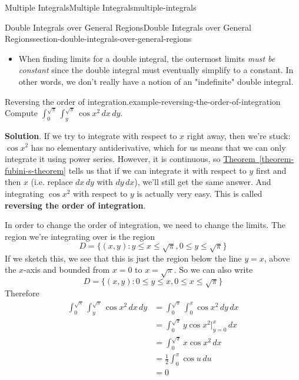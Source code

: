 \documentclass[oneside,10pt,]{book}
\newcommand{\terminology}[1]{\textbf{#1}}
\numberwithin{equation}{section}
\begin{document}
\begin{chapterptx}{Multiple Integrals}{}{Multiple Integrals}{}{}{multiple-integrals}
\begin{sectionptx}{Double Integrals over General Regions}{}{Double Integrals over General Regions}{}{}{section-double-integrals-over-general-regions}
\begin{itemize}[label=\textbullet]
\item{}When finding limits for a double integral, the outermost limits \emph{must be constant} since the double integral must eventually simplify to a constant. In other words, we don't really have a notion of an "indefinite" double integral.%
\end{itemize}
%
\begin{example}{Reversing the order of integration.}{example-reversing-the-order-of-integration}%
\hypertarget{p-1480}{}%
Compute \(\int_{0}^{\sqrt{\pi}}\int_{y}^{\sqrt{\pi}}\cos x^{2}\,dx\,dy\).%
\par\smallskip%
\noindent\textbf{Solution}.\hypertarget{solution-242}{}\quad%
\hypertarget{p-1481}{}%
If we try to integrate with respect to \(x\) right away, then we're stuck: \(\cos x^{2}\) has no elementary antiderivative, which for us means that we can only integrate it using power series. However, it is continuous, so \hyperref[theorem-fubini-s-theorem]{Theorem~\ref{theorem-fubini-s-theorem}} tells us that if we can integrate it with respect to \(y\) first and then \(x\) (i.e. replace \(dx\,dy\) with \(dy\,dx\)), we'll still get the same answer. And integrating \(\cos x^{2}\) with respect to \(y\) is actually very easy. This is called \terminology{reversing the order of integration}.%
\par
\hypertarget{p-1482}{}%
In order to change the order of integration, we need to change the limits. The region we're integrating over is the region%
\begin{equation*}
D = \{(x,y) : y\leq x\leq \sqrt{\pi}, 0\leq y\leq\sqrt{\pi}\}
\end{equation*}
If we sketch this, we see that this is just the region below the line \(y = x\), above the \(x\)-axis and bounded from \(x=0\) to \(x=\sqrt{\pi}\). So we can also write%
\begin{equation*}
D = \{(x,y) : 0\leq y\leq x, 0\leq x\leq\sqrt{\pi}\}
\end{equation*}
Therefore%
\begin{align*}
\int_{0}^{\sqrt{\pi}}\int_{y}^{\sqrt{\pi}}\cos x^{2}\,dx\,dy & = \int_{0}^{\sqrt{\pi}}\int_{0}^{x}\cos x^{2}\,dy\,dx \\
& = \int_{0}^{\sqrt{\pi}}y\cos x^{2}\bigg|_{y=0}^{x}\,dx \\
& = \int_{0}^{\sqrt{\pi}}x\cos x^{2}\,dx \\
& = \frac{1}{2}\int_{0}^{\pi}\cos u\,du \\
& = 0 
\end{align*}
%
\end{example}

\end{sectionptx}
\end{chapterptx}
\end{document}
